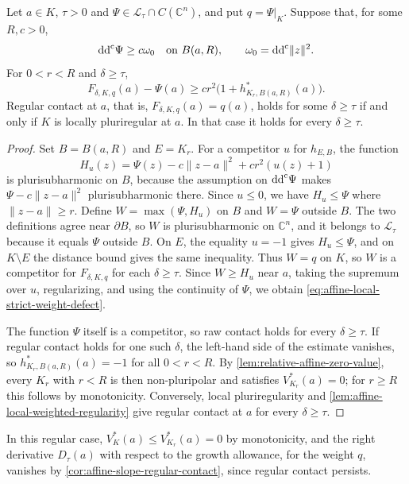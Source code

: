 \begin{theorem}\label{thm:affine-local-strict-weight}
Let $a\in K$, $\tau>0$ and $\Psi\in\mathcal L_\tau\cap C(\mathbb C^n)$, and put $q=\Psi|_K$. Suppose that, for some $R,c>0$,
\[
 \mathrm{dd}^{\mathrm{c}}\Psi\geq c\omega_0\quad\text{on }B(a,R),
 \qquad\omega_0=\mathrm{dd}^{\mathrm{c}}\lVert z\rVert^2.
\]
For $0<r<R$ and $\delta\geq\tau$,
\begin{equation}\label{eq:affine-local-strict-weight-defect}
 F_{\delta,K,q}(a)-\Psi(a)
 \geq cr^2\bigl(1+h_{K_r,B(a,R)}^*(a)\bigr).
\end{equation}
Regular contact at $a$, that is, $F_{\delta,K,q}(a)=q(a)$, holds for some $\delta\geq\tau$ if and only if $K$ is locally pluriregular at $a$. In that case it holds for every $\delta\geq\tau$.
\end{theorem}
\begin{proof}
Set $B=B(a,R)$ and $E=K_r$. For a competitor $u$ for $h_{E,B}$, the function
\[
 H_u(z)=\Psi(z)-c\lVert z-a\rVert^2+cr^2(u(z)+1)
\]
is plurisubharmonic on $B$, because the assumption on $\mathrm{dd}^{\mathrm{c}}\Psi$ makes $\Psi-c\lVert z-a\rVert^2$ plurisubharmonic there. Since $u\leq0$, we have $H_u\leq\Psi$ where $\lVert z-a\rVert\geq r$. Define $W=\max(\Psi,H_u)$ on $B$ and $W=\Psi$ outside $B$. The two definitions agree near $\partial B$, so $W$ is plurisubharmonic on $\mathbb C^n$, and it belongs to $\mathcal L_\tau$ because it equals $\Psi$ outside $B$. On $E$, the equality $u=-1$ gives $H_u\leq\Psi$, and on $K\setminus E$ the distance bound gives the same inequality. Thus $W=q$ on $K$, so $W$ is a competitor for $F_{\delta,K,q}$ for each $\delta\geq\tau$. Since $W\geq H_u$ near $a$, taking the supremum over $u$, regularizing, and using the continuity of $\Psi$, we obtain \eqref{eq:affine-local-strict-weight-defect}.

The function $\Psi$ itself is a competitor, so raw contact holds for every $\delta\geq\tau$. If regular contact holds for one such $\delta$, the left-hand side of the estimate vanishes, so $h_{K_r,B(a,R)}^*(a)=-1$ for all $0<r<R$. By \cref{lem:relative-affine-zero-value}, every $K_r$ with $r<R$ is then non-pluripolar and satisfies $V_{K_r}^*(a)=0$; for $r\geq R$ this follows by monotonicity. Conversely, local pluriregularity and \cref{lem:affine-local-weighted-regularity} give regular contact at $a$ for every $\delta\geq\tau$.
\end{proof}

In this regular case, $V_K^*(a)\leq V_{K_r}^*(a)=0$ by monotonicity, and the right derivative $D_\tau(a)$ with respect to the growth allowance, for the weight $q$, vanishes by \cref{cor:affine-slope-regular-contact}, since regular contact persists.

